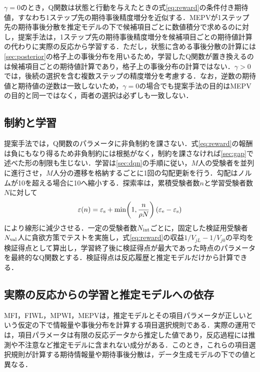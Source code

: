 \documentclass[paper]{ieicej}
\begin{document}
$\gamma=0$のとき，Q関数は状態と行動を与えたときの式\eqref{eq:reward}の条件付き期待値，すなわち1ステップ先の期待事後精度増分を近似する．MEPVが1ステップ先の期待事後分散を推定モデルの下で候補項目ごとに数値積分で求めるのに対し，提案手法は，1ステップ先の期待事後精度増分を候補項目ごとの期待値計算の代わりに実際の反応から学習する．ただし，状態に含める事後分散の計算には\ref{sec:posterior}の格子上の事後分布を用いるため，学習したQ関数が置き換えるのは候補項目ごとの期待値計算であり，格子上の事後分布の計算ではない．$\gamma>0$では，後続の選択を含む複数ステップの精度増分を考慮する．なお，逆数の期待値と期待値の逆数は一致しないため，$\gamma=0$の場合でも提案手法の目的はMEPVの目的と同一ではなく，両者の選択は必ずしも一致しない．

\subsection{制約と学習}\label{sec:learning}

提案手法では，Q関数のパラメータに非負制約を課さない．式\eqref{eq:reward}の報酬は負にもなり得るため非負制約には根拠がなく，制約を課さなければ\ref{sec:gap}で述べた形の制限も生じない．学習は\ref{sec:dqn}の手順に従い，$M$人の受験者を並列に進行させ，$M$人分の遷移を格納するごとに1回の勾配更新を行う．勾配はノルムが10を超える場合に10へ縮小する．探索率は，累積受験者数$n$と学習受験者数$N$に対して
\begin{equation}
 \varepsilon(n)=\varepsilon_{\rm s}+\min\!\left(1,\frac{n}{\rho N}\right)(\varepsilon_{\rm e}-\varepsilon_{\rm s})
 \label{eq:epsilon}
\end{equation}
により線形に減少させる．一定の受験者数$N_{\rm int}$ごとに，固定した検証用受験者$N_{\rm val}$人に貪欲方策でテストを実施し，式\eqref{eq:reward}の収益$1/V_{jL}-1/V_{j0}$の平均を検証得点として算出し，学習終了後に検証得点が最大であった時点のパラメータを最終的なQ関数とする．検証得点は反応履歴と推定モデルだけから計算できる．

\subsection{実際の反応からの学習と推定モデルへの依存}\label{sec:misspec}

MFI，FIWL，MPWI，MEPVは，推定モデルとその項目パラメータが正しいという仮定の下で情報量や事後分布を計算する項目選択規則である．実際の運用では，項目パラメータは有限の反応データから推定した値であり，反応過程には推測や不注意など推定モデルに含まれない成分がある．このとき，これらの項目選択規則が計算する期待情報量や期待事後分散は，データ生成モデルの下での値と異なる．
\end{document}

